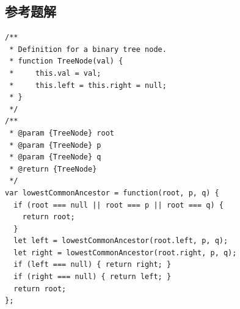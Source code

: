 \subsection{参考题解}

\begin{verbatim}
/**
 * Definition for a binary tree node.
 * function TreeNode(val) {
 *     this.val = val;
 *     this.left = this.right = null;
 * }
 */
/**
 * @param {TreeNode} root
 * @param {TreeNode} p
 * @param {TreeNode} q
 * @return {TreeNode}
 */
var lowestCommonAncestor = function(root, p, q) {
  if (root === null || root === p || root === q) {
    return root;
  }
  let left = lowestCommonAncestor(root.left, p, q);
  let right = lowestCommonAncestor(root.right, p, q);
  if (left === null) { return right; }
  if (right === null) { return left; }
  return root;
};
\end{verbatim}

